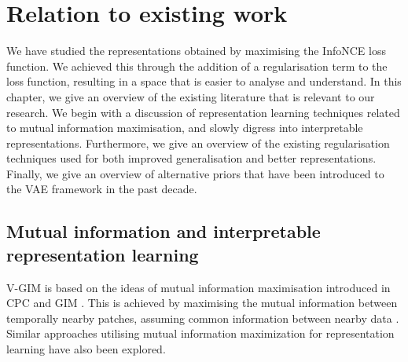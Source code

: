 %
%
%

\chapter{Relation to existing work} \label{cha:5}

We have studied the representations obtained by maximising the InfoNCE loss function. We achieved this through the addition of a regularisation term to the loss function, resulting in a space that is easier to analyse and understand. In this chapter, we give an overview of the existing literature that is relevant to our research. We begin with a discussion of representation learning techniques related to mutual information maximisation, and slowly digress into interpretable representations. Furthermore, we give an overview of the existing regularisation techniques used for both improved generalisation and better representations. Finally, we give an overview of alternative priors that have been introduced to the VAE framework in the past decade.


\section{Mutual information and interpretable representation learning}

	V-GIM is based on the ideas of mutual information maximisation introduced in CPC and GIM \citep{lowePuttingEndEndtoEnd2020, oordRepresentationLearningContrastive2019}. This is achieved by maximising the mutual information between temporally nearby patches, assuming common information between nearby data \citep{lowePuttingEndEndtoEnd2020}. Similar approaches utilising mutual information maximization for representation learning have also been explored.
	
